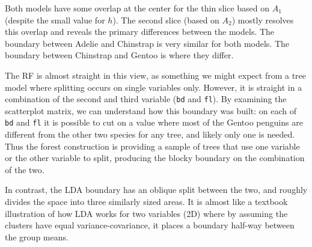 \documentclass[]{interact}
\theoremstyle{plain}%
\theoremstyle{definition}
\theoremstyle{remark}
\begin{document}
Both models have some overlap at the center for the thin slice based on
\(A_1\) (despite the small value for \(h\)). The second slice (based on
\(A_2\)) mostly resolves this overlap and reveals the primary
differences between the models. The boundary between Adelie and
Chinstrap is very similar for both models. The boundary between
Chinstrap and Gentoo is where they differ.

The RF is almost straight in this view, as something we might expect
from a tree model where splitting occurs on single variables only.
However, it is straight in a combination of the second and third
variable (\texttt{bd} and \texttt{fl}). By examining the scatterplot
matrix, we can understand how this boundary was built: on each of
\texttt{bd} and \texttt{fl} it is possible to cut on a value where most
of the Gentoo penguins are different from the other two species for any
tree, and likely only one is needed. Thus the forest construction is
providing a sample of trees that use one variable or the other variable
to split, producing the blocky boundary on the combination of the two.

In contrast, the LDA boundary has an oblique split between the two, and
roughly divides the space into three similarly sized areas. It is almost
like a textbook illustration of how LDA works for two variables (2D)
where by assuming the clusters have equal variance-covariance, it places
a boundary half-way between the group means.
\end{document}
